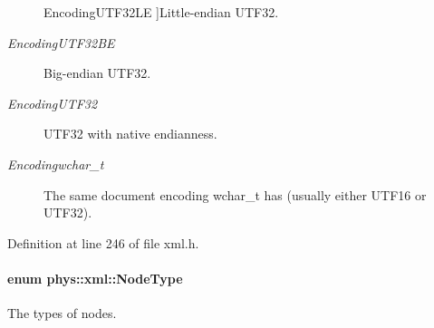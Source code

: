 \begin{Desc}
\begin{description}
{{EncodingUTF32LE}
\label{d9/d27/namespacephys_1_1xml_a420f5de782438f88160321385bea2015a127752883aaf8c9bdb5f66ec725211fc}
}]Little-\/endian UTF32. \item[{\em 
\hypertarget{namespacephys_1_1xml_a420f5de782438f88160321385bea2015a5fb13deaf1552b0f4c00e2b8cafce0b9}{
EncodingUTF32BE}
\label{d9/d27/namespacephys_1_1xml_a420f5de782438f88160321385bea2015a5fb13deaf1552b0f4c00e2b8cafce0b9}
}]Big-\/endian UTF32. \item[{\em 
\hypertarget{namespacephys_1_1xml_a420f5de782438f88160321385bea2015ac61c2f632bd66c2466c29783beb33f8a}{
EncodingUTF32}
\label{d9/d27/namespacephys_1_1xml_a420f5de782438f88160321385bea2015ac61c2f632bd66c2466c29783beb33f8a}
}]UTF32 with native endianness. \item[{\em 
\hypertarget{namespacephys_1_1xml_a420f5de782438f88160321385bea2015a2bc9c8d42796901c8feaa25e17c56cef}{
Encodingwchar\_\-t}
\label{d9/d27/namespacephys_1_1xml_a420f5de782438f88160321385bea2015a2bc9c8d42796901c8feaa25e17c56cef}
}]The same document encoding wchar\_\-t has (usually either UTF16 or UTF32). \end{description}
\end{Desc}



Definition at line 246 of file xml.h.

\hypertarget{namespacephys_1_1xml_a668b0cc666a9d49f7c7222a7552115d3}{
\paragraph[{NodeType}]{\setlength{\rightskip}{0pt plus 5cm}enum {\bf phys::xml::NodeType}}\hfill}
\label{d9/d27/namespacephys_1_1xml_a668b0cc666a9d49f7c7222a7552115d3}


The types of nodes. 

